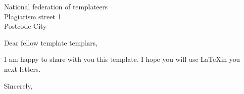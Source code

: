 \documentclass[11pt, a4paper]{lettre}
\begin{document}
\begin{letter}{ National federation of templateers\\Plagiarism street 1\\Postcode City}

	\address{Mrs Myself\\ Street of mine \\Postcode City}
	\nofax
	
	
	\opening{Dear fellow template templars,}
	
	I am happy to share with you this template. I hope you will use \LaTeX in you next letters.
	
	\closing{Sincerely,}
\end{letter}
\end{document}
